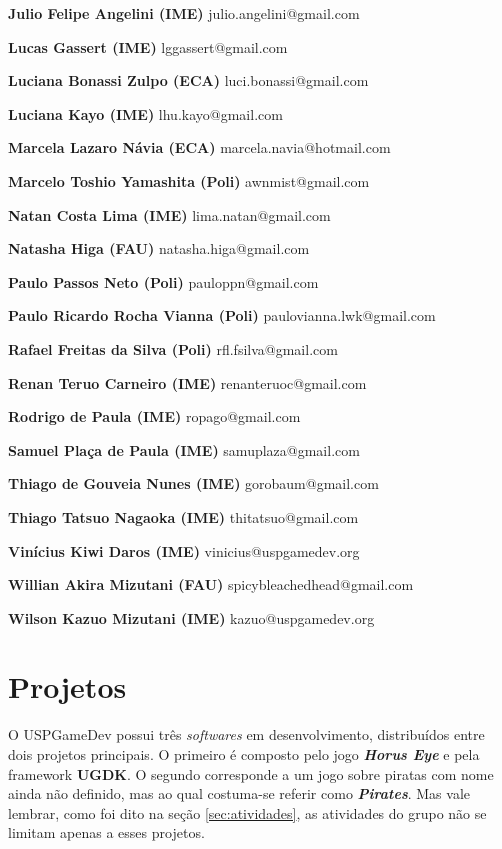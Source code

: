 \documentclass[12pt,onecolumn,a4paper]{article}
\begin{document}
\begin{list}{}
        \item[\bf Julio Felipe Angelini (IME)] julio.angelini@gmail.com
        \item[\bf Lucas Gassert (IME)] lggassert@gmail.com
        \item[\bf Luciana Bonassi Zulpo (ECA)] luci.bonassi@gmail.com
        \item[\bf Luciana Kayo (IME)] lhu.kayo@gmail.com
        \item[\bf Marcela Lazaro Návia (ECA)] marcela.navia@hotmail.com
        \item[\bf Marcelo Toshio Yamashita (Poli)] awnmist@gmail.com
        \item[\bf Natan Costa Lima (IME)] lima.natan@gmail.com
        \item[\bf Natasha Higa (FAU)] natasha.higa@gmail.com
        \item[\bf Paulo Passos Neto (Poli)] pauloppn@gmail.com
        \item[\bf Paulo Ricardo Rocha Vianna (Poli)] paulovianna.lwk@gmail.com
        \item[\bf Rafael Freitas da Silva (Poli)] rfl.fsilva@gmail.com
        \item[\bf Renan Teruo Carneiro (IME)] renanteruoc@gmail.com
        \item[\bf Rodrigo de Paula (IME)] ropago@gmail.com
        \item[\bf Samuel Plaça de Paula (IME)] samuplaza@gmail.com
        \item[\bf Thiago de Gouveia Nunes (IME)] gorobaum@gmail.com
        \item[\bf Thiago Tatsuo Nagaoka (IME)] thitatsuo@gmail.com
        \item[\bf Vinícius Kiwi Daros (IME)]  vinicius@uspgamedev.org
        \item[\bf Willian Akira Mizutani (FAU)] spicybleachedhead@gmail.com
        \item[\bf Wilson Kazuo Mizutani (IME)] kazuo@uspgamedev.org
    
    \end{list}    

\section{\LARGE Projetos}
    O USPGameDev possui três \textit{softwares} em desenvolvimento, distribuídos entre dois projetos
    principais. O primeiro é composto pelo jogo \textit{\textbf{Horus Eye}} e pela framework
    \textbf{UGDK}. O segundo corresponde a um jogo sobre piratas com nome ainda não definido, mas ao
    qual costuma-se referir como \textit{\textbf{Pirates}}. Mas vale lembrar, como foi dito na seção
    \ref{sec:atividades}, as atividades do grupo não se limitam apenas a esses projetos.
    
\end{document}

